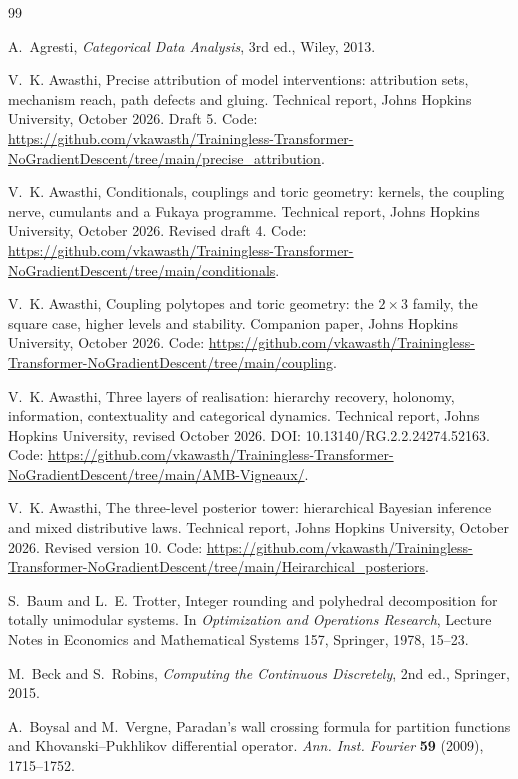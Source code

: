 \documentclass[11pt]{article}
\theoremstyle{definition}
\theoremstyle{remark}
\begin{document}
\begin{thebibliography}{99}

A.~Agresti, \emph{Categorical Data Analysis}, 3rd ed., Wiley, 2013.

V.~K. Awasthi, Precise attribution of model interventions: attribution sets, mechanism reach, path defects and gluing.
Technical report, Johns Hopkins University, October 2026. Draft 5. Code: \url{https://github.com/vkawasth/Trainingless-Transformer-NoGradientDescent/tree/main/precise_attribution}.

V.~K. Awasthi, Conditionals, couplings and toric geometry: kernels, the coupling nerve, cumulants and a {F}ukaya
programme. Technical report, Johns Hopkins University, October 2026. Revised draft 4. Code: \url{https://github.com/vkawasth/Trainingless-Transformer-NoGradientDescent/tree/main/conditionals}.

V.~K. Awasthi, Coupling polytopes and toric geometry: the $2\times3$ family, the square case, higher levels and stability.
Companion paper, Johns Hopkins University, October 2026. Code: \url{https://github.com/vkawasth/Trainingless-Transformer-NoGradientDescent/tree/main/coupling}.

V.~K. Awasthi, Three layers of realisation: hierarchy recovery, holonomy, information, contextuality and categorical
dynamics. Technical report, Johns Hopkins University, revised October 2026. DOI: 10.13140/RG.2.2.24274.52163. Code: \url{https://github.com/vkawasth/Trainingless-Transformer-NoGradientDescent/tree/main/AMB-Vigneaux/}.

V.~K. Awasthi, The three-level posterior tower: hierarchical {B}ayesian inference and mixed distributive laws.
Technical report, Johns Hopkins University, October 2026. Revised version 10. Code: \url{https://github.com/vkawasth/Trainingless-Transformer-NoGradientDescent/tree/main/Heirarchical_posteriors}.

S.~Baum and L.~E. Trotter, Integer rounding and polyhedral decomposition for totally unimodular systems. In
\emph{Optimization and Operations Research}, Lecture Notes in Economics and Mathematical Systems 157, Springer, 1978,
15--23.

M.~Beck and S.~Robins, \emph{Computing the Continuous Discretely}, 2nd ed., Springer, 2015.

A.~Boysal and M.~Vergne, Paradan's wall crossing formula for partition functions and Khovanski--Pukhlikov differential
operator. \emph{Ann. Inst. Fourier} \textbf{59} (2009), 1715--1752.


\end{thebibliography}
\end{document}
